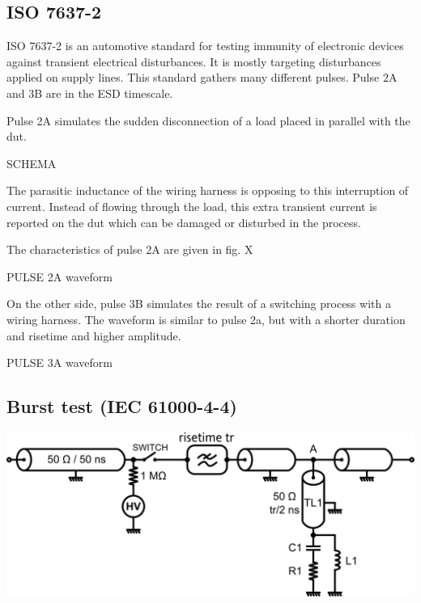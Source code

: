 \subsection{ISO 7637-2}
ISO 7637-2\cite{iso7637-2} is an automotive standard for testing immunity of electronic devices against transient electrical disturbances.
It is mostly targeting disturbances applied on supply lines.
This standard gathers many different pulses. Pulse 2A and 3B are in the ESD timescale.

Pulse 2A simulates the sudden disconnection of a load placed in parallel with the \gls{dut}.

SCHEMA

The parasitic inductance of the wiring harness is opposing to this interruption of current.
Instead of flowing through the load, this extra transient current is reported on the \gls{dut} which can be damaged or disturbed in the process.

The characteristics of pulse 2A are given in fig. X

PULSE 2A waveform

On the other side, pulse 3B simulates the result of a switching process with a wiring harness.
The waveform is similar to pulse 2a, but with a shorter duration and risetime and higher amplitude.

PULSE 3A waveform

\subsection{Burst test (IEC 61000-4-4)}

\includegraphics[width=\textwidth,height=\textheight,keepaspectratio]{src/2/figures/tlp_iec.png}
